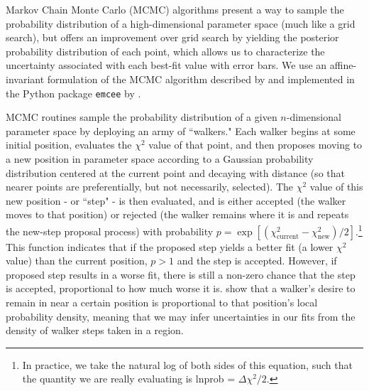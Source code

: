 Markov Chain Monte Carlo (MCMC) algorithms present a way to sample the probability distribution of a high-dimensional parameter space (much like a grid search), but offers an improvement over grid search by yielding the posterior probability distribution of each point, which allows us to characterize the uncertainty associated with each best-fit value with error bars. We use an affine-invariant formulation of the MCMC algorithm described by \citet{Goodman2010} and implemented in the Python package \texttt{emcee} by \citet{ForemanMackey2013}.

MCMC routines sample the probability distribution of a given $n$-dimensional parameter space by deploying an army of ``walkers." Each walker begins at some initial position, evaluates the $\chi^2$ value of that point, and then proposes moving to a new position in parameter space according to a Gaussian probability distribution centered at the current point and decaying with distance (so that nearer points are preferentially, but not necessarily, selected). The $\chi^2$ value of this new position - or ``step" - is then evaluated, and is either accepted (the walker moves to that position) or rejected (the walker remains where it is and repeats the new-step proposal process) with probability $p = \exp \left[ (\chi_\text{current}^2 - \chi_\text{new}^2)/2 \right]$.\footnote{In practice, we take the natural log of both sides of this equation, such that the quantity we are really evaluating is lnprob = $\Delta \chi^2/2$.} This function indicates that if the proposed step yields a better fit (a lower $\chi^2$ value) than the current position, $p > 1$ and the step is accepted. However, if proposed step results in a worse fit, there is still a non-zero chance that the step is accepted, proportional to how much worse it is. \citet{Goodman2010} show that a walker's desire to remain in near a certain position is proportional to that position's local probability density, meaning that we may infer uncertainties in our fits from the density of walker steps taken in a region.


